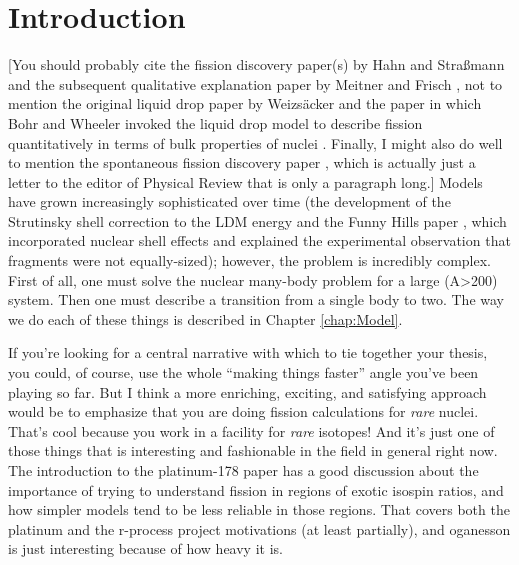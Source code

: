 \chapter{Introduction}\label{chap:Intro}

\maketitle

[You should probably cite the fission discovery paper(s) by Hahn and Stra\ss{}mann \cite{Hahn1939} and the subsequent qualitative explanation paper by Meitner and Frisch \cite{Meitner1939}, not to mention the original liquid drop paper by Weizs\"acker \cite{Weizsacker1935} and the paper in which Bohr and Wheeler invoked the liquid drop model to describe fission quantitatively in terms of bulk properties of nuclei \cite{Bohr1939}. Finally, I might also do well to mention the spontaneous fission discovery paper \cite{Flerov1940}, which is actually just a letter to the editor of Physical Review that is only a paragraph long.] Models have grown increasingly sophisticated over time (the development of the Strutinsky shell correction to the LDM energy and the Funny Hills paper \cite{Strutinsky1967,Strutinsky1968,Brack1972}, which incorporated nuclear shell effects and explained the experimental observation that fragments were not equally-sized); however, the problem is incredibly complex. First of all, one must solve the nuclear many-body problem for a large (A>200) system. Then one must describe a transition from a single body to two. The way we do each of these things is described in Chapter \ref{chap:Model}.

If you're looking for a central narrative with which to tie together your thesis, you could, of course, use the whole ``making things faster'' angle you've been playing so far. But I think a more enriching, exciting, and satisfying approach would be to emphasize that you are doing fission calculations for \textit{rare} nuclei. That's cool because you work in a facility for \textit{rare} isotopes! And it's just one of those things that is interesting and fashionable in the field in general right now. The introduction to the platinum-178 paper has a good discussion about the importance of trying to understand fission in regions of exotic isospin ratios, and how simpler models tend to be less reliable in those regions. That covers both the platinum and the r-process project motivations (at least partially), and oganesson is just interesting because of how heavy it is.

